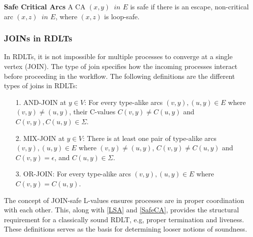 \begin{defn}\textbf{Safe Critical Arcs} \cite{MalinaoPJS2023}
    \label{SafeCA}
    A CA $ (x,y) $ $\ in $ $ E $ is safe if there is an escape, non-critical arc $ (x,z) $ $\ in $ $ E $, where $ (x,z) $ is loop-safe.
\end{defn}
\subsubsection*{JOINs in RDLTs}
In RDLTs, it is not impossible for multiple processes to converge at a single vertex (JOIN). The type of join specifies how the incoming processes interact before proceeding in the workflow. The following definitions are the different types of joins in RDLTs:
\begin{itemize}
    \item[1.] AND-JOIN at $y \in V$: For every type-alike arcs $(v,y), (u,y) \in E$ where $(v,y) \neq (u,y)$, their C-values $C(v,y) \neq C(u,y)$ and $C(v,y),C(u,y) \in \Sigma$.
    \item[2.] MIX-JOIN at $y \in V$: There is at least one pair of type-alike arcs $(v,y), (u,y) \in E$ where $(v,y) \neq (u,y)$, $C(v,y) \neq C(u,y)$ and $C(v,y) = \epsilon$, and $C(u,y) \in \Sigma$.
    \item[3.] OR-JOIN: For every type-alike arcs $(v,y), (u,y) \in E$ where $C(v,y)=C(u,y)$.
\end{itemize}
The concept of JOIN-safe L-values ensures processes are in proper coordination with each other. This, along with \ref{LSA} and \ref{SafeCA}, provides the structural requirement for a classically sound RDLT, e.g, proper termination and liveness. These definitions serves as the basis for determining looser notions of soundness.
